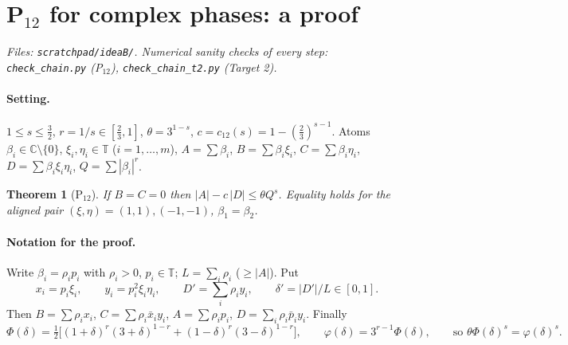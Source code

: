 \documentclass[11pt]{article}
\newtheorem{theorem}{Theorem}\newtheorem{lemma}[theorem]{Lemma}\newtheorem{corollary}[theorem]{Corollary}
\theoremstyle{remark}\newtheorem{remark}[theorem]{Remark}
\newcommand{\T}{\mathbb T}
\begin{document}
\section*{P$_{12}$ for complex phases: a proof}
\emph{Files: \texttt{scratchpad/ideaB/}.  Numerical sanity checks of every step: \texttt{check\_chain.py} (P$_{12}$), \texttt{check\_chain\_t2.py} (Target 2).}


\paragraph{Setting.} $1\le s\le\frac32$, $r=1/s\in[\frac23,1]$, $\theta=3^{1-s}$, $c=c_{12}(s)=1-(\frac23)^{s-1}$.
Atoms $\beta_i\in\mathbb C\setminus\{0\}$, $\xi_i,\eta_i\in\T$ ($i=1,\dots,m$), $A=\sum\beta_i$, $B=\sum\beta_i\xi_i$,
$C=\sum\beta_i\eta_i$, $D=\sum\beta_i\xi_i\eta_i$, $Q=\sum|\beta_i|^r$.

\begin{theorem}[P$_{12}$]\label{thm}
If $B=C=0$ then $|A|-c\,|D|\le\theta Q^s$.  Equality holds for the aligned pair $(\xi,\eta)=(1,1),(-1,-1)$, $\beta_1=\beta_2$.
\end{theorem}

\paragraph{Notation for the proof.} Write $\beta_i=\rho_ip_i$ with $\rho_i>0$, $p_i\in\T$; $L=\sum_i\rho_i$ ($\ge|A|$). Put
\[x_i=p_i\xi_i,\qquad y_i=p_i^2\xi_i\eta_i,\qquad D'=\sum_i\rho_iy_i,\qquad \delta'=|D'|/L\in[0,1].\]
Then $B=\sum\rho_ix_i$, $C=\sum\rho_i\bar x_iy_i$, $A=\sum\rho_ip_i$, $D=\sum_i\rho_i\bar p_iy_i$.  Finally
\[\Phi(\delta)=\tfrac12\big[(1+\delta)^r(3+\delta)^{1-r}+(1-\delta)^r(3-\delta)^{1-r}\big],\qquad
\varphi(\delta)=3^{r-1}\Phi(\delta),\qquad\text{so }\theta\Phi(\delta)^s=\varphi(\delta)^s .\]
\end{document}
